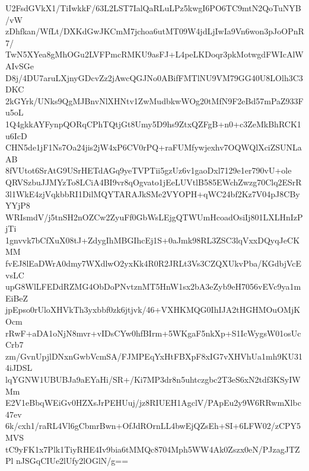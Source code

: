 U2FsdGVkX1/TiIwkkF/63L2LST7IalQaRLuLPz5kwgI6PO6TC9mtN2QoTuNYB/vW
zDhfkan/WfLt/DXKdGwJKCmM7jchoa6utMT09W4jdLjIwIa9Vn6won3pJoOPnR7/
TwN5XYea8gMhOGu2LVFPmcRMKU9asFJ+L4peLKDoqr3pkMotwgdFWIcAlWAIvSGe
D8j/4DU7aruLXjnyGDcvZz2jAwcQGJNo0ABifFMTlNU9VM79GG40U8LOlh3C3DKC
2kGYrk/UNks9QgMJBnvNlXHNtv1ZwMudbkwWOg20tMfN9F2eBd57mPaZ933Fu5oL
1Q4gkkAYFynpQORqCPhTQtjGt8Umy5D9hs9ZtxQZFgB+n0+c3ZeMkBhRCK1u6IcD
CHN5de1jF1Ns7Oa24jis2jW4xP6CV0rPQ+raFUMfywjexhv7OQWQlXciZSUNLaAB
8fVUtot6SrAtG9USrHETdAGq9yeTVPTii5gzUz6v1gaoDxl7129e1er790vU+ole
QRVSzbuJJMYzTo8LCiA4BI9vr8qOgvato1jEeLUVtlB585EWchZwzg70Clq2ESrR
3l1WkE4zjVqkbbRI1DilMQYTARAJkSMe2VYOPH+qWC24bf2Kz7V04pJ8CByYYjP8
WRIsmdV/j5tnSH2nOZCw2ZyuFf0GbWsLEjgQTWUmHcoadOsiIj801LXLHnIzPjTi
1gnvvk7bCfXuX08tJ+ZdygIhMBGIhcEj1S+0aJmk98RL3ZSC3lqVxxDQyqJeCKMM
fvEJ8lEaDWrA0dmy7WXdlwO2yxKk4R0R2JRLt3Vs3CZQXUkvPba/KGdbjVcEvsLC
upG8WlLFEDdRZMG4ObDoPNvtznMT5HnW1sx2bA3eZyb9eH7056vEVc9ya1mEiBeZ
jpEpso0rUloXHVkTh3yxbbf0zk6jtjvk/46+VXHKMQG0IhIJA2tHGHMOuOMjKOcm
rRwF+aDA1oNjN8mvr+vIDsCYw0hfBIrm+5WKgaF5nkXp+S1IcWygsW01osUcCrb7
zm/GvnUpjlDNxnGwbVcmSA/FJMPEqYxHtFBXpF8xIG7vXHVhUa1mh9KU314iJDSL
lqYGNW1UBUBJa9aEYaHi/SR+/Ki7MP3dr8n5uhtczgbc2T3eS6xN2tdf3KSyIWMm
E2V1eBbqWEiGv0HZXsJrPEHUuj/jz8RIUEH1AgclV/PApEu2y9W6RRwmXlbc47ev
6k/cxh1/raRL4Vl6gCbmrBwn+OfJdROrnLL4bwEjQZsEh+SI+6LFW02/zCPY5MVS
tC9yFK1x7Plk1TiyRHE4Iv9bia6tMMQc8704Mph5WW4Ak0Zszx0eN/PJzagJTZPl
nJSGqCIUe2lUfy2lOGlN/g==
